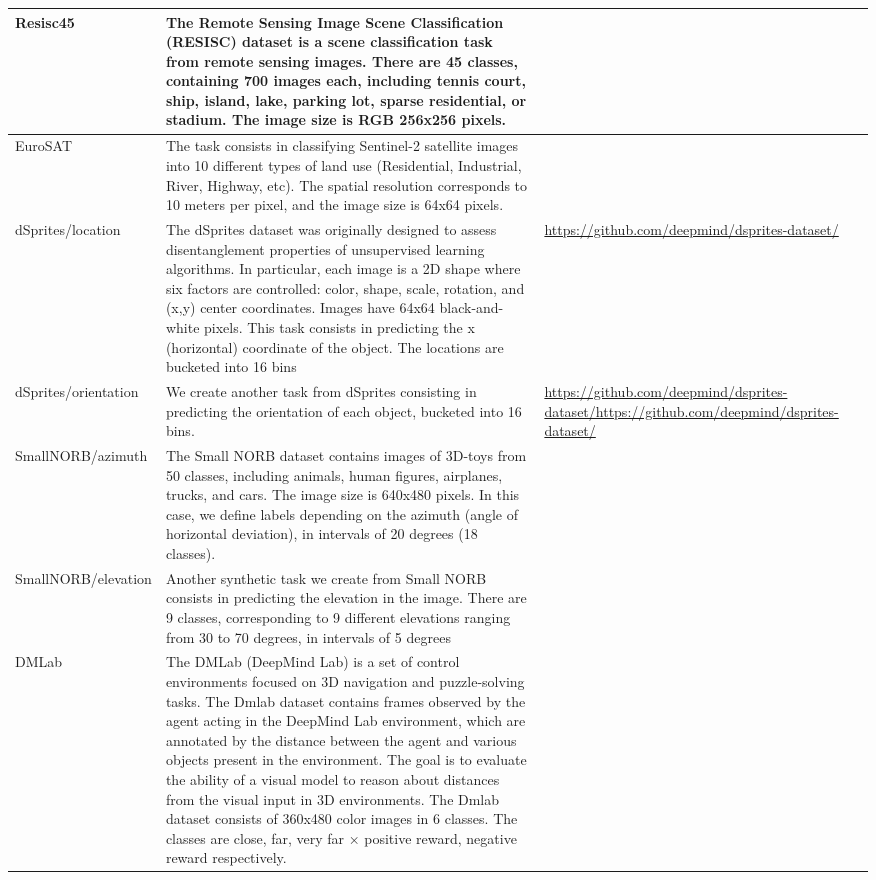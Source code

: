 \begin{table}[ht]
{{\begin{tabular}{l p{12cm} p{5cm}}
        Resisc45 & The Remote Sensing Image Scene Classification (RESISC) dataset is a scene classification task from remote sensing images. There are 45 classes, containing 700 images each, including tennis court, ship, island, lake, parking lot, sparse residential, or stadium. The image size is RGB 256x256 pixels. &~\citep{cheng2017remote} \\ \midrule
        EuroSAT & The task consists in classifying Sentinel-2 satellite images into 10 different types of land use (Residential, Industrial, River, Highway, etc). The spatial resolution corresponds to 10 meters per pixel, and the image size is 64x64 pixels. &~\citep{helber2019eurosat} \\ \midrule
        dSprites/location & The dSprites dataset was originally designed to assess disentanglement properties of unsupervised learning algorithms. In particular, each image is a 2D shape where six factors are controlled: color, shape, scale, rotation, and (x,y) center coordinates. Images have 64x64 black-and-white pixels. This task consists in predicting the x (horizontal) coordinate of the object. The locations are bucketed into 16 bins & \url{https://github.com/deepmind/dsprites-dataset/}\\ \midrule
        dSprites/orientation & We create another task from dSprites consisting in predicting the orientation of each object, bucketed into 16 bins. & \url{https://github.com/deepmind/dsprites-dataset/https://github.com/deepmind/dsprites-dataset/} \\ \midrule
        SmallNORB/azimuth & The Small NORB dataset contains images of 3D-toys from 50 classes, including animals, human figures, airplanes, trucks, and cars. The image size is 640x480 pixels. In this case, we define labels depending on the azimuth (angle of horizontal deviation), in intervals of 20 degrees (18 classes). &~\citep{lecun2004learning}\\ \midrule
        SmallNORB/elevation & Another synthetic task we create from Small NORB consists in predicting the elevation in the image. There are 9 classes, corresponding to 9 different elevations ranging from 30 to 70 degrees, in intervals of 5 degrees & ~\citep{lecun2004learning} \\ \midrule
        DMLab & The DMLab (DeepMind Lab) is a set of control environments focused on 3D navigation and puzzle-solving tasks. The Dmlab dataset contains frames observed by the agent acting in the DeepMind Lab environment, which are annotated by the distance between the agent and various objects present in the environment. The goal is to evaluate the ability of a visual model to reason about distances from the visual input in 3D environments. The Dmlab dataset consists of 360x480 color images in 6 classes. The classes are {close, far, very far} × {positive reward, negative reward} respectively. &~\citep{beattie2016deepmind} \\ \midrule

\end{tabular}}}
\end{table}
